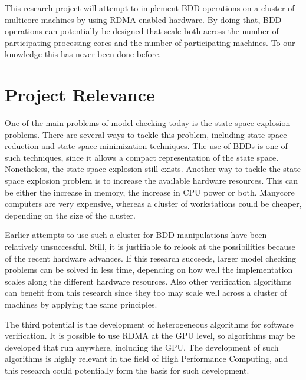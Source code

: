 This research project will attempt to implement BDD operations on a cluster of multicore machines by using RDMA-enabled hardware. By doing that, BDD operations can potentially be designed that scale both across the number of participating processing cores and the number of participating machines. To our knowledge this has never been done before.

\section{Project Relevance}
One of the main problems of model checking today is the state space explosion problems. There are several ways to tackle this problem, including state space reduction and state space minimization techniques. The use of BDDs is one of such techniques, since it allows a compact representation of the state space. Nonetheless, the state space explosion still exists. Another way to tackle the state space explosion problem is to increase the available hardware resources. This can be either the increase in memory, the increase in CPU power or both. Manycore computers are very expensive, whereas a cluster of workstations could be cheaper, depending on the size of the cluster.

Earlier attempts to use such a cluster for BDD manipulations have been relatively unsuccessful. Still, it is justifiable to relook at the possibilities because of the recent hardware advances. If this research succeeds, larger model checking problems can be solved in less time, depending on how well the implementation scales along the different hardware resources. Also other verification algorithms can benefit from this research since they too may scale well across a cluster of machines by applying the same principles.

The third potential is the development of heterogeneous algorithms for software verification. It is possible to use RDMA at the GPU level, so algorithms may be developed that run anywhere, including the GPU. The development of such algorithms is highly relevant in the field of High Performance Computing, and this research could potentially form the basis for such development.
